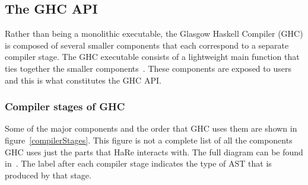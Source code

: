 \subsection{The GHC API}

Rather than being a monolithic executable, the Glasgow Haskell Compiler (GHC) is composed of several smaller components that each correspond to a separate compiler stage. The GHC executable consists of a lightweight main function that ties together the smaller components~\citep{ghcDesign}. These components are exposed to users  and this is what constitutes the GHC API.

\subsubsection{Compiler stages of GHC}\label{ghcStages}

Some of the major components and the order that GHC uses them are shown in figure~\ref{compilerStages}. This figure is not a complete list of all the components GHC uses just the parts that HaRe interacts with. The full diagram can be found in~\citep{ghcDesign}. The label after each compiler stage indicates the type of AST that is produced by that stage.

